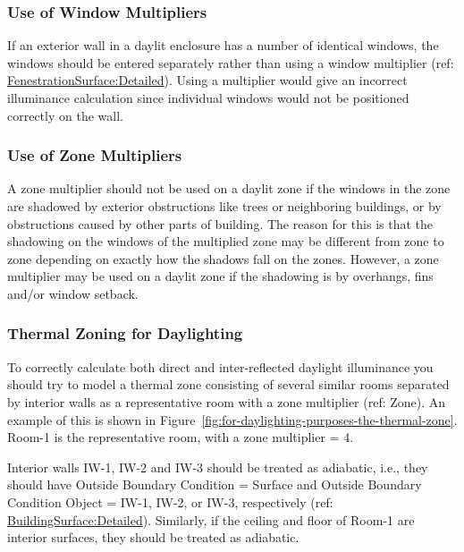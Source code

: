 \subsubsection{Use of Window Multipliers}\label{use-of-window-multipliers}

If an exterior wall in a daylit enclosure has a number of identical windows, the windows should be entered separately rather than using a window multiplier (ref: \hyperref[fenestrationsurfacedetailed]{FenestrationSurface:Detailed}). Using a multiplier would give an incorrect illuminance calculation since individual windows would not be positioned correctly on the wall.

\subsubsection{Use of Zone Multipliers}\label{use-of-zone-multipliers}

A zone multiplier should not be used on a daylit zone if the windows in the zone are shadowed by exterior obstructions like trees or neighboring buildings, or by obstructions caused by other parts of building. The reason for this is that the shadowing on the windows of the multiplied zone may be different from zone to zone depending on exactly how the shadows fall on the zones. However, a zone multiplier may be used on a daylit zone if the shadowing is by overhangs, fins and/or window setback.

\subsubsection{Thermal Zoning for Daylighting}\label{thermal-zoning-for-daylighting}

To correctly calculate both direct and inter-reflected daylight illuminance you should try to model a thermal zone consisting of several similar rooms separated by interior walls as a representative room with a zone multiplier (ref: Zone). An example of this is shown in Figure~\ref{fig:for-daylighting-purposes-the-thermal-zone}. Room-1 is the representative room, with a zone multiplier = 4.

Interior walls IW-1, IW-2 and IW-3 should be treated as adiabatic, i.e., they should have Outside Boundary Condition = Surface and Outside Boundary Condition Object = IW-1, IW-2, or IW-3, respectively (ref: \hyperref[buildingsurfacedetailed]{BuildingSurface:Detailed}). Similarly, if the ceiling and floor of Room-1 are interior surfaces, they should be treated as adiabatic.

